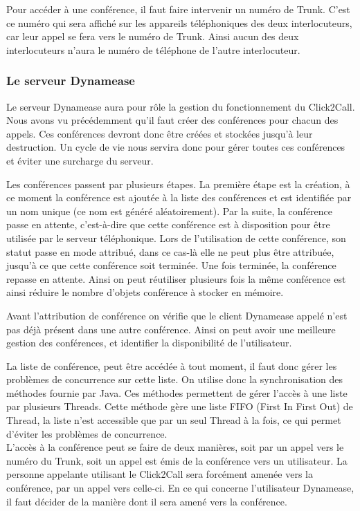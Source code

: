 Pour accéder à une conférence, il faut faire intervenir un numéro de Trunk. C'est ce numéro qui sera affiché sur les appareils téléphoniques des deux interlocuteurs, car leur appel se fera vers le numéro de Trunk. Ainsi aucun des deux interlocuteurs n'aura le numéro de téléphone de l'autre interlocuteur.

\subsubsection{Le serveur Dynamease}

Le serveur Dynamease aura pour rôle la gestion du fonctionnement du Click2Call. Nous avons vu précédemment qu'il faut créer des conférences pour chacun des appels. Ces conférences devront donc être créées et stockées jusqu'à leur destruction. Un cycle de vie nous servira donc pour gérer toutes ces conférences et éviter une surcharge du serveur.

Les conférences passent par plusieurs étapes. La première étape est la création, à ce moment la conférence est ajoutée à la liste des conférences et est identifiée par un nom unique (ce nom est généré aléatoirement). Par la suite, la conférence passe en attente, c'est-à-dire que cette conférence est à disposition pour être utilisée par le serveur téléphonique. Lors de l'utilisation de cette conférence, son statut passe en mode attribué, dans ce cas-là elle ne peut plus être attribuée, jusqu'à ce que cette conférence soit terminée. Une fois terminée, la conférence repasse en attente. Ainsi on peut réutiliser plusieurs fois la même conférence est ainsi réduire le nombre d'objets conférence à stocker en mémoire.

Avant l'attribution de conférence on vérifie que le client Dynamease appelé n'est pas déjà présent dans une autre conférence. Ainsi on peut avoir une meilleure gestion des conférences, et identifier la disponibilité de l'utilisateur.

La liste de conférence, peut être accédée à tout moment, il faut donc gérer les problèmes de concurrence sur cette liste. On utilise donc la synchronisation des méthodes fournie par Java. Ces méthodes permettent de gérer l'accès à une liste par plusieurs Threads. Cette méthode gère une liste FIFO (First In First Out) de Thread, la liste n'est accessible que par un seul Thread à la fois, ce qui permet d'éviter les problèmes de concurrence.\\

L'accès à la conférence peut se faire de deux manières, soit par un appel vers le numéro du Trunk, soit un appel est émis de la conférence vers un utilisateur. La personne appelante utilisant le Click2Call sera forcément amenée vers la conférence, par un appel vers celle-ci. En ce qui concerne l'utilisateur Dynamease, il faut décider de la manière dont il sera amené vers la conférence.


